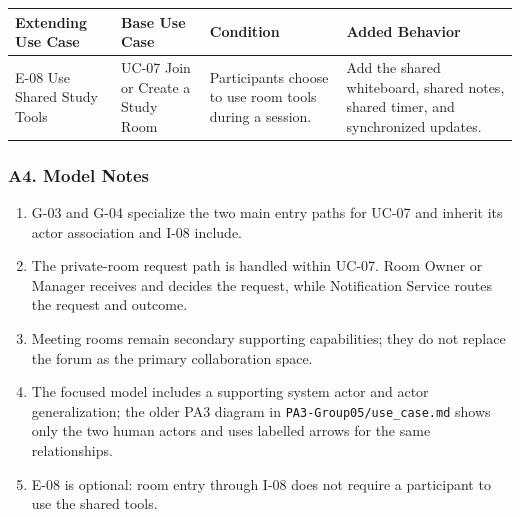 \documentclass[12pt]{article}
\renewcommand{\baselinestretch}{1.5}
\begin{document}
\begingroup
\small
\renewcommand{\baselinestretch}{1.0}\selectfont
\renewcommand{\arraystretch}{1.15}
\setlength{\tabcolsep}{6pt}
\begin{longtable}{|>{\raggedright\arraybackslash}p{}|>{\raggedright\arraybackslash}p{}|>{\raggedright\arraybackslash}p{}|>{\raggedright\arraybackslash}p{}|}
\hline
\textbf{Extending Use Case} & \textbf{Base Use Case} & \textbf{Condition} & \textbf{Added Behavior} \\ \hline
\endhead
E-08 Use Shared Study Tools & UC-07 Join or Create a Study Room & Participants choose to use room tools during a session. & Add the shared whiteboard, shared notes, shared timer, and synchronized updates. \\ \hline
\end{longtable}
\endgroup
\par\medskip

\hypertarget{sec:a4-model-notes}{}
\subsubsection*{A4. Model Notes}
\par\medskip

\begin{enumerate}
\item G-03 and G-04 specialize the two main entry paths for UC-07 and inherit its actor association and I-08 include.
\item The private-room request path is handled within UC-07. Room Owner or Manager receives and decides the request, while Notification Service routes the request and outcome.
\item Meeting rooms remain secondary supporting capabilities; they do not replace the forum as the primary collaboration space.
\item The focused model includes a supporting system actor and actor generalization; the older PA3 diagram in \texttt{PA3-Group05/use\_case.md} shows only the two human actors and uses labelled arrows for the same relationships.
\item E-08 is optional: room entry through I-08 does not require a participant to use the shared tools.
\end{enumerate}
\par\medskip

\hypertarget{sec:part-b-use-case-specification}{}
\end{document}
